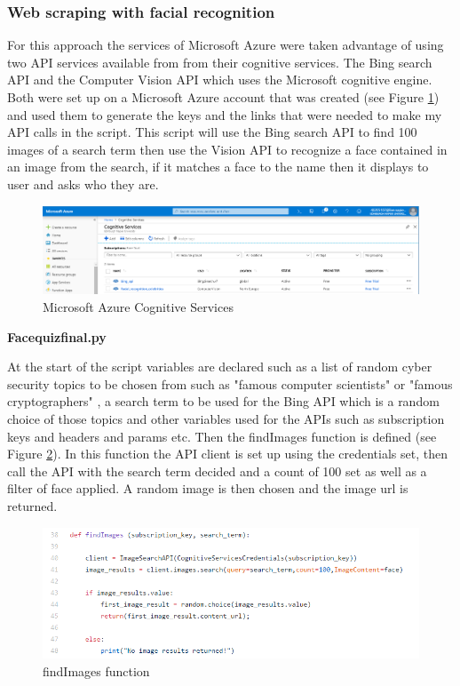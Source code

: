 \documentclass[12pt,a4paper]{article}
\begin{document}
\subsubsection{Web scraping with facial recognition}   

For this approach the services of Microsoft Azure were taken advantage of using two API services available from from their cognitive services. The Bing search API and the Computer Vision API which uses the Microsoft cognitive engine. Both were set up on a Microsoft Azure account that was created (see Figure \ref{Azure}) and used them to generate the keys and the links that were needed to make my API calls in the script. This script will use the Bing search API to find 100 images of a search term then use the Vision API to recognize a face contained in an image from the search, if it matches a face to the name then it displays to user and asks who they are. 

\begin{figure}[!ht]
    \centering
    \includegraphics[width=1.0\textwidth]{Figs/Azure.PNG} 
    \caption{Microsoft Azure Cognitive Services} 
    \label{Azure}
\end{figure}

\textbf{Face\textunderscore quiz\textunderscore final.py} 

At the start of the script variables are declared such as a list of random cyber security topics to be chosen from such as "famous computer scientists" or "famous cryptographers" , a search term to be used for the Bing API which is a random choice of those topics and other variables used for the APIs such as subscription keys and headers and params etc. Then the findImages function is defined (see Figure \ref{findimages}). In this function the API client is set up using the credentials set, then call the API with the search term decided and a count of 100 set as well as a filter of face applied. A random image is then chosen and  the image url is returned. 

\begin{figure}[!ht]
    \centering
    \includegraphics[width=1.0\textwidth]{Figs/findimages.PNG} 
    \caption{findImages function} 
    \label{findimages}
\end{figure}  
\end{document}
